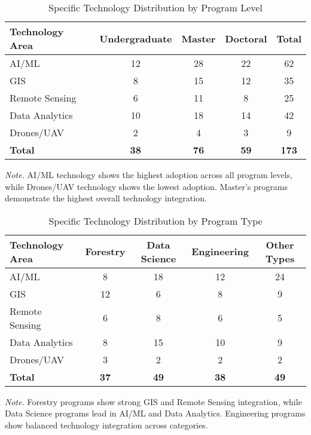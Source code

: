 \begin{table}[H]
\centering
\caption{Specific Technology Distribution by Program Level}
\label{tab:rq8_specific_tech_by_level}
\begin{tabular}{lcccc}
\toprule
\textbf{Technology Area} & \textbf{Undergraduate} & \textbf{Master} & \textbf{Doctoral} & \textbf{Total} \\
\midrule
AI/ML & 12 & 28 & 22 & 62 \\
GIS & 8 & 15 & 12 & 35 \\
Remote Sensing & 6 & 11 & 8 & 25 \\
Data Analytics & 10 & 18 & 14 & 42 \\
Drones/UAV & 2 & 4 & 3 & 9 \\
\midrule
\textbf{Total} & \textbf{38} & \textbf{76} & \textbf{59} & \textbf{173} \\
\bottomrule
\end{tabular}
\small
\textit{Note.} AI/ML technology shows the highest adoption across all program levels, while Drones/UAV technology shows the lowest adoption. Master's programs demonstrate the highest overall technology integration.
\end{table}

\begin{table}[H]
\centering
\caption{Specific Technology Distribution by Program Type}
\label{tab:rq8_specific_tech_by_type}
\begin{tabular}{lcccc}
\toprule
\textbf{Technology Area} & \textbf{Forestry} & \textbf{Data Science} & \textbf{Engineering} & \textbf{Other Types} \\
\midrule
AI/ML & 8 & 18 & 12 & 24 \\
GIS & 12 & 6 & 8 & 9 \\
Remote Sensing & 6 & 8 & 6 & 5 \\
Data Analytics & 8 & 15 & 10 & 9 \\
Drones/UAV & 3 & 2 & 2 & 2 \\
\midrule
\textbf{Total} & \textbf{37} & \textbf{49} & \textbf{38} & \textbf{49} \\
\bottomrule
\end{tabular}
\small
\textit{Note.} Forestry programs show strong GIS and Remote Sensing integration, while Data Science programs lead in AI/ML and Data Analytics. Engineering programs show balanced technology integration across categories.
\end{table}

